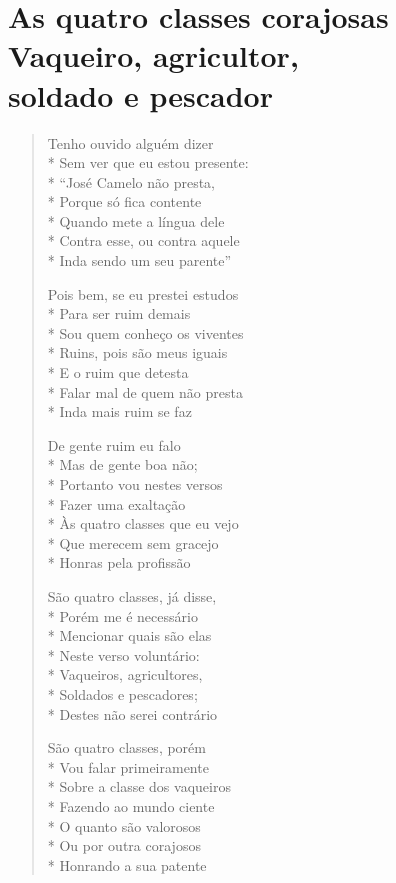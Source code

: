 \chapter[As quatro classes corajosas -- Vaqueiro, agricultor, soldado e pescador]{As quatro classes corajosas\\ Vaqueiro, agricultor,\\ soldado e pescador}

\begin{verse}

Tenho ouvido alguém dizer\\*
Sem ver que eu estou presente:\\*
``José Camelo não presta,\\*
Porque só fica contente\\*
Quando mete a língua dele\\*
Contra esse, ou contra aquele\\*
Inda sendo um seu parente''

Pois bem, se eu prestei estudos\\*
Para ser ruim demais\\*
Sou quem conheço os viventes\\*
Ruins, pois são meus iguais\\*
E o ruim que detesta\\*
Falar mal de quem não presta\\*
Inda mais ruim se faz

De gente ruim eu falo\\*
Mas de gente boa não;\\*
Portanto vou nestes versos\\*
Fazer uma exaltação\\*
Às quatro classes que eu vejo\\*
Que merecem sem gracejo\\*
Honras pela profissão

São quatro classes, já disse,\\*
Porém me é necessário\\*
Mencionar quais são elas\\*
Neste verso voluntário:\\*
Vaqueiros, agricultores,\\*
Soldados e pescadores;\\*
Destes não serei contrário

São quatro classes, porém\\*
Vou falar primeiramente\\*
Sobre a classe dos vaqueiros\\*
Fazendo ao mundo ciente\\*
O quanto são valorosos\\*
Ou por outra corajosos\\*
Honrando a sua patente


\end{verse}
